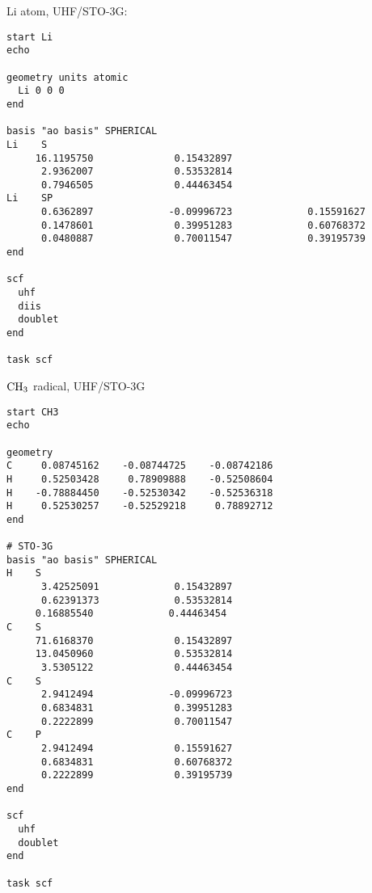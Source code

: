 \documentclass[a4paper, 12pt]{article}
\begin{document}
Li atom, UHF/STO-3G:

\begin{lstlisting}
start Li
echo

geometry units atomic
  Li 0 0 0
end

basis "ao basis" SPHERICAL
Li    S
     16.1195750              0.15432897       
      2.9362007              0.53532814       
      0.7946505              0.44463454       
Li    SP
      0.6362897             -0.09996723             0.15591627       
      0.1478601              0.39951283             0.60768372       
      0.0480887              0.70011547             0.39195739       
end

scf
  uhf
  diis
  doublet
end

task scf
\end{lstlisting}

\bigskip

$\rm CH_3$ radical, UHF/STO-3G

\begin{lstlisting}
start CH3
echo

geometry
C     0.08745162    -0.08744725    -0.08742186
H     0.52503428     0.78909888    -0.52508604
H    -0.78884450    -0.52530342    -0.52536318
H     0.52530257    -0.52529218     0.78892712
end

# STO-3G
basis "ao basis" SPHERICAL
H    S
      3.42525091             0.15432897       
      0.62391373             0.53532814       
     0.16885540             0.44463454  
C    S
     71.6168370              0.15432897       
     13.0450960              0.53532814       
      3.5305122              0.44463454       
C    S
      2.9412494             -0.09996723
      0.6834831              0.39951283    
      0.2222899              0.70011547            
C    P
      2.9412494              0.15591627       
      0.6834831              0.60768372       
      0.2222899              0.39195739    
end

scf
  uhf
  doublet
end

task scf
\end{lstlisting}

\clearpage


{}
\end{document}
